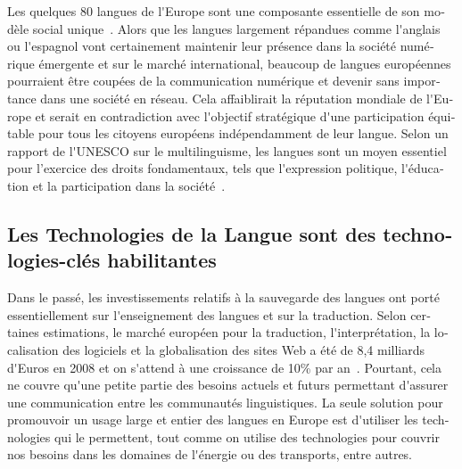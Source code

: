 \documentclass[]{../metanetpaper}
\begin{document}
\begin{french}
\begin{multicols}{2}

Les quelques 80 langues de l{\mbox '}Europe sont une composante
essentielle de son modèle social unique~\cite{EC2}. Alors que les
langues largement répandues comme l{\mbox '}anglais ou l{\mbox
 '}espagnol vont certainement maintenir leur présence dans la société
numérique émergente et sur le marché international, beaucoup de
langues européennes pourraient être coupées de la communication
numérique et devenir sans importance dans une société en réseau. Cela
affaiblirait la réputation mondiale de l{\mbox '}Europe et serait en
contradiction avec l{\mbox '}objectif stratégique d{\mbox '}une
participation équitable pour tous les citoyens européens
indépendamment de leur langue. Selon un rapport de l{\mbox '}UNESCO
sur le multilinguisme, les langues sont un moyen essentiel pour
l'exercice des droits fondamentaux, tels que l{\mbox '}expression
politique, l{\mbox '}éducation et la participation dans la
société~\cite{UNESCO2007}.

\subsection{Les Technologies de la Langue sont des technologies-clés habilitantes}

Dans le passé, les investissements relatifs à la sauvegarde des
langues ont porté essentiellement sur l{\mbox '}enseignement des
langues et sur la traduction. Selon certaines estimations, le marché
européen pour la traduction, l{\mbox '}interprétation, la localisation
des logiciels et la globalisation des sites Web a été de 8,4 milliards
d{\mbox '}Euros en 2008 et on s{\mbox '}attend à une croissance de
10\% par an~\cite{EC3}. Pourtant, cela ne couvre qu{\mbox '}une petite
partie des besoins actuels et futurs permettant d{\mbox '}assurer une
communication entre les communautés linguistiques. La seule solution
pour promouvoir un usage large et entier des langues en Europe est
d{\mbox '}utiliser les technologies qui le permettent, tout comme on
utilise des technologies pour couvrir nos besoins dans les domaines de
l{\mbox '}énergie ou des transports, entre autres.


\end{multicols}
\end{french}
\end{document}
